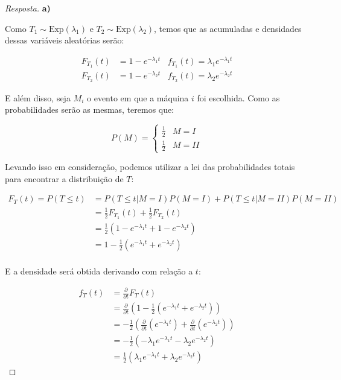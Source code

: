 \documentclass[
]{article}
\theoremstyle{definition}
\theoremstyle{definition}
\theoremstyle{definition}
\theoremstyle{definition}
\theoremstyle{remark}
\begin{document}
\begin{proof}[Resposta]
\textbf{a)}

Como \(T_{1} \sim \mathrm{Exp}(\lambda_{1})\) e \(T_{2} \sim \mathrm{Exp}(\lambda_{2})\), temos que as acumuladas e densidades dessas variáveis aleatórias serão:

\begin{align*}
F_{T_{1}}(t) &= 1 - e^{-\lambda_{1}t} \;\;\; f_{T_{1}}(t) = \lambda_{1}e^{-\lambda_{1}t} \\
F_{T_{2}}(t) &= 1 - e^{-\lambda_{2}t} \;\;\; f_{T_{2}}(t) = \lambda_{2}e^{-\lambda_{2}t}
\end{align*}

E além disso, seja \(M_{i}\) o evento em que a máquina \(i\) foi escolhida. Como as probabilidades serão as mesmas, teremos que:

\begin{equation*}
P(M) = \begin{cases}
\frac{1}{2} & M=I\\
\frac{1}{2} & M=II
\end{cases}
\end{equation*}

Levando isso em consideração, podemos utilizar a lei das probabilidades totais para encontrar a distribuição de \(T\):

\begin{align*}
F_{T}(t) = P(T \le t) &= P(T \le t|M=I)P(M=I) + P(T \le t|M=II)P(M=II) \\
&= \frac{1}{2}F_{T_{1}}(t) + \frac{1}{2}F_{T_{2}}(t) \\
&= \frac{1}{2}(1 - e^{-\lambda_{1}t} + 1 - e^{-\lambda_{2}t}) \\
&= 1 - \frac{1}{2}\left(e^{-\lambda_{1}t} + e^{-\lambda_{2}t}\right) \\
\end{align*}

E a densidade será obtida derivando com relação a \(t\):

\begin{align*}
f_{T}(t) &= \frac{\partial}{\partial t}F_{T}(t) \\
&= \frac{\partial}{\partial t}\left(1 - \frac{1}{2}\left(e^{-\lambda_{1}t} + e^{-\lambda_{2}t}\right)\right) \\
&= -\frac{1}{2}\left(\frac{\partial}{\partial t}\left(e^{-\lambda_{1}t}\right) + \frac{\partial}{\partial t}\left(e^{-\lambda_{2}t}\right)\right) \\
&= -\frac{1}{2}\left(-\lambda_{1}e^{-\lambda_{1}t} -\lambda_{2}e^{-\lambda_{2}t}\right) \\
&= \frac{1}{2}\left(\lambda_{1}e^{-\lambda_{1}t} + \lambda_{2}e^{-\lambda_{2}t}\right)
\end{align*}


\end{proof}
\end{document}
